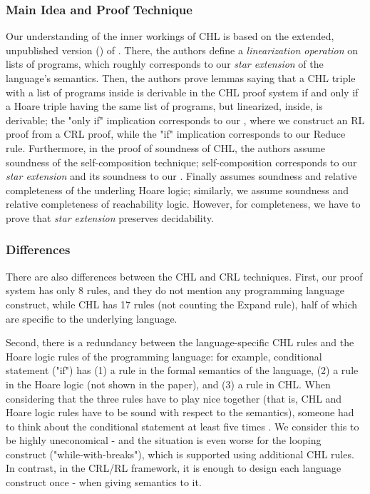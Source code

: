 \documentclass{article}
\begin{document}
\subsubsection{Main Idea and Proof Technique}

Our understanding of the inner workings of CHL is based on the extended, unpublished version (\cite{SousaD16Extended})
of \cite{SousaD16}.
There, the authors define a \emph{linearization operation} on lists of programs, which roughly corresponds to our
\emph{star extension} of the language's semantics.
Then, the authors prove lemmas saying that a CHL triple with a list of programs inside is derivable
in the CHL proof system
if and only if 
a Hoare triple having the same list of programs, but linearized, inside, is derivable;
the "only if" implication corresponds to our , where we construct
an RL proof from a CRL proof,
while the "if" implication corresponds to our Reduce rule.
Furthermore, in the proof of soundness of CHL, the authors assume soundness of the self-composition technique;
self-composition corresponds to our \emph{star extension} and its soundness to our .
Finally \cite{SousaD16Extended} assumes soundness and relative completeness of the underling Hoare logic;
similarly, we assume soundness and relative completeness of reachability logic.
However, for completeness, we have to prove that \emph{star extension} preserves decidability.

\subsubsection{Differences}
There are also differences between the CHL and CRL techniques.
First, our proof system has only 8 rules, and they do not mention any programming language construct,
while CHL has 17 rules (not counting the Expand rule), half of which are specific to the underlying language.

Second, there is a redundancy between the language-specific CHL rules and the Hoare logic rules of the
programming language: for example, conditional statement ("if") has (1) a rule in the formal semantics of the language,
(2) a rule in the Hoare logic (not shown in the paper), and (3) a rule in CHL.
When considering that the three rules have to play nice together (that is, CHL and Hoare logic rules have to be sound with respect to the semantics), someone had to think about the conditional statement at least five times .
We consider this to be highly uneconomical
- and the situation
is even worse for the looping construct ("while-with-breaks"), which is supported using additional CHL rules.
In contrast, in the CRL/RL framework, it is enough to design each language construct once - when giving
semantics to it.
\end{document}

